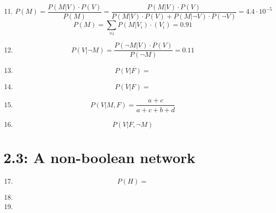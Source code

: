 \documentclass[a4paper,10pt,fleqn]{article}
\begin{document}
\begin{enumerate}[1.]
	\setcounter{enumi}{10}

    \item $$P(M) = \frac{P(M|V)\cdot P(V)}{P(M)} = \frac{P(M|V)\cdot P(V)}{P(M|V)\cdot P(V) + P(M|\lnot V)\cdot P(\lnot V)} = 4.4 \cdot 10^{-5}  $$
    $$P(M) = \sum_{\forall i} P(M|V_i) \cdot (V_i) = 0.91  $$

    \item $$P(V|\lnot M) = \frac{P(\lnot M|V) \cdot P(V)}{P(\lnot M)} = 0.11	$$

	\item

    $$ P(V|F) =$$

    \item
    $$ P(V| F) = $$


    \item $$P(V |M, F) = \frac{a + c}{a+c+b+d}$$

    \item $$P(V |F, \neg M)$$


\end{enumerate}

\section*{2.3: A non-boolean network}
\begin{enumerate}[1.]
	\setcounter{enumi}{16}
    \item $$ P(H) = $$

    \item

    \item

\end{enumerate}
\end{document}
